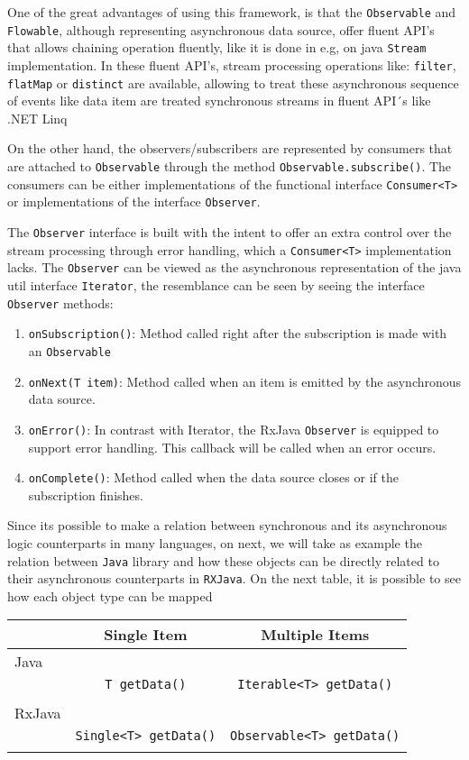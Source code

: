 One of the great advantages of using this framework, is that the \texttt{Observable} and \texttt{Flowable}, although representing asynchronous data source, offer fluent API's that allows chaining operation fluently, like it is done in e.g, on java \texttt{Stream} implementation.
In these fluent API's, stream processing operations like: \texttt{filter}, \texttt{flatMap} or \texttt{distinct} are available, allowing to treat these asynchronous sequence of events like data item are treated synchronous streams in fluent API´s like .NET Linq

On the other hand, the observers/subscribers are represented by consumers that are attached to \texttt{Observable} through the method \texttt{Observable.subscribe()}.
The consumers can be either implementations of the functional interface \texttt{Consumer<T>} or implementations of the interface \texttt{Observer}.

The \texttt{Observer} interface is built with the intent to offer an extra control over the stream processing through error handling, which a \texttt{Consumer<T>} implementation lacks. The \texttt{Observer} can be viewed as the asynchronous representation of the java util interface \texttt{Iterator}, the resemblance can be seen by seeing the interface \texttt{Observer} methods:

\begin{enumerate}
     \item \texttt{onSubscription()}: Method called right after the subscription is made with an \texttt{Observable} 
	 \item \texttt{onNext(T item)}: Method called when an item is emitted by the asynchronous data source.
	 \item \texttt{onError()}: In contrast with Iterator, the RxJava \texttt{Observer} is equipped to support error handling. This callback will be called when an error occurs.
	 \item \texttt{onComplete()}: Method called when the data source closes or if the subscription finishes.
\end{enumerate}	

Since its possible to make a relation between synchronous and its asynchronous logic counterparts in many languages, on next, we will take as example the relation between \texttt{Java} library and how these objects can be directly related to their asynchronous counterparts in \texttt{RXJava}.
On the next table, it is possible to see how each object type can be mapped 

\begin{center}
\begin{tabular}{ |l|c|c| }
\hline
	& Single Item & Multiple Items \\ \hline
	Java & & \\ 
& \texttt{T getData()}  & \texttt{Iterable<T> getData()} \\
	& & \\
	\hline
	RxJava & & \\ 
& \texttt{Single<T> getData()} & \texttt{Observable<T> getData()} \\
	& & \\
	\hline
\end{tabular}
\end{center}


